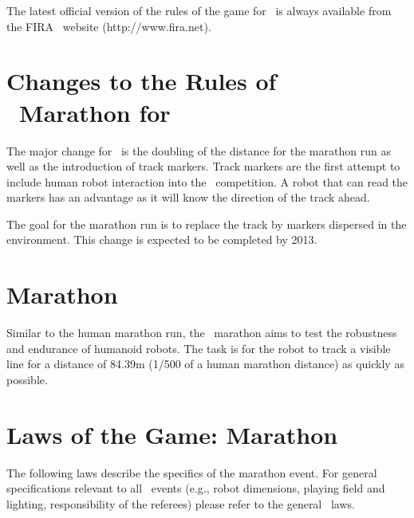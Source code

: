 \documentclass[12pt]{hurocup}
\begin{document}
The latest official version of the rules of the game for \HuroCup\ is
always available from the FIRA \HuroCup\ website (http://www.fira.net).

\section*{Changes to the Rules of \HuroCup\ Marathon for \thisyear}

The major change for \thisyear\ is the doubling of the distance for
the marathon run as well as the introduction of track markers. Track
markers are the first attempt to include human robot interaction into
the \HuroCup\ competition. A robot that can read the markers has an
advantage as it will know the direction of the track ahead.

The goal for the marathon run is to replace the track by markers
dispersed in the environment. This change is expected to be completed
by 2013.

\newpage

\section{Marathon}
\label{sec:marathon} 

Similar to the human marathon run, the \HuroCup\ marathon aims to test
the robustness and endurance of humanoid robots. The task is for the
robot to track a visible line for a distance of 84.39m (1/500 of a
human marathon distance) as quickly as possible. 

\section{Laws of the Game: Marathon}
\label{sec:marathon-laws}

The following laws describe the specifics of the marathon
event. For general specifications relevant to all \HuroCup\ events
(e.g., robot dimensions, playing field and lighting, responsibility of
the referees) please refer to the general \HuroCup\ laws.

\label{mr-field}
\end{document}
